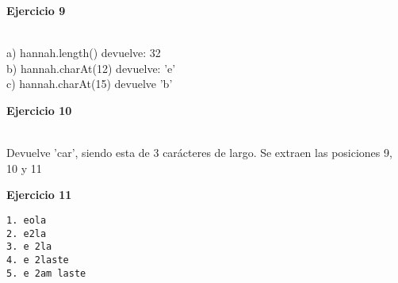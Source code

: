 \documentclass[12pt,letterpaper, onecolumn]{exam}
\begin{document}
\begin{questions}
\question[] \textbf{Ejercicio 9}\droppoints

\begin{solution} \\
  a) hannah.length() devuelve: 32 \\
  b) hannah.charAt(12) devuelve: 'e' \\
  c) hannah.charAt(15) devuelve 'b'
\end{solution}


\question[] \textbf{Ejercicio 10}\droppoints

\begin{solution} \\
  Devuelve 'car', siendo esta de 3 carácteres de largo. Se extraen las posiciones 9, 10 y 11
\end{solution}


\question[] \textbf{Ejercicio 11}\droppoints
\begin{solution}
\begin{verbatim}
1. eola
2. e2la
3. e 2la
4. e 2laste
5. e 2am laste
\end{verbatim}

\end{solution}
  \end{questions}
\end{document}
